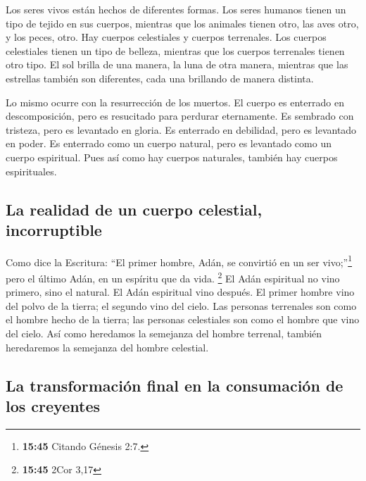  Los seres vivos están hechos de diferentes formas. Los
seres humanos tienen un tipo de tejido en sus cuerpos, mientras que los
animales tienen otro, las aves otro, y los peces, otro. 
Hay cuerpos celestiales y cuerpos terrenales. Los cuerpos celestiales
tienen un tipo de belleza, mientras que los cuerpos terrenales tienen
otro tipo.  El sol brilla de una manera, la luna de otra
manera, mientras que las estrellas también son diferentes, cada una
brillando de manera distinta.

 Lo mismo ocurre con la resurrección de los muertos. El
cuerpo es enterrado en descomposición, pero es resucitado para perdurar
eternamente.  Es sembrado con tristeza, pero es levantado
en gloria. Es enterrado en debilidad, pero es levantado en poder.
 Es enterrado como un cuerpo natural, pero es levantado
como un cuerpo espiritual. Pues así como hay cuerpos naturales, también
hay cuerpos espirituales.

\hypertarget{la-realidad-de-un-cuerpo-celestial-incorruptible}{%
\subsection{La realidad de un cuerpo celestial,
incorruptible}\label{la-realidad-de-un-cuerpo-celestial-incorruptible}}

 Como dice la Escritura: ``El primer hombre, Adán, se
convirtió en un ser vivo;''\footnote{\textbf{15:45} Citando Génesis 2:7.}
pero el último Adán, en un espíritu que da vida. \footnote{\textbf{15:45}
  2Cor 3,17}  El Adán espiritual no vino primero, sino el
natural. El Adán espiritual vino después.  El primer
hombre vino del polvo de la tierra; el segundo vino del cielo.
 Las personas terrenales son como el hombre hecho de la
tierra; las personas celestiales son como el hombre que vino del cielo.
 Así como heredamos la semejanza del hombre terrenal,
también heredaremos la semejanza del hombre celestial.

\hypertarget{la-transformaciuxf3n-final-en-la-consumaciuxf3n-de-los-creyentes}{%
\subsection{La transformación final en la consumación de los
creyentes}\label{la-transformaciuxf3n-final-en-la-consumaciuxf3n-de-los-creyentes}}

